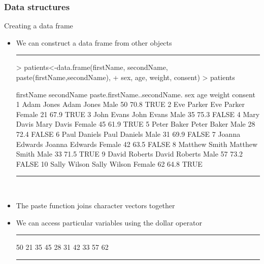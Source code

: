 \documentclass{beamer}
\begin{document}
\begin{frame}[fragile]
	\frametitle{Data structures}
	\centering \LARGE Creating a data frame
	\begin{itemize}
		\small
		\item We can construct a data frame from other objects
\rule{\textwidth}{0.4pt}
\tiny
\begin{Schunk}
\begin{Sinput}
> patients<-data.frame(firstName, secondName, paste(firstName,secondName),
+ 		     sex, age, weight, consent)
> patients
\end{Sinput}
\begin{Soutput}
   firstName secondName paste.firstName..secondName.    sex age weight consent
1       Adam      Jones                   Adam Jones   Male  50   70.8    TRUE
2        Eve     Parker                   Eve Parker Female  21   67.9    TRUE
3       John      Evans                   John Evans   Male  35   75.3   FALSE
4       Mary      Davis                   Mary Davis Female  45   61.9    TRUE
5      Peter      Baker                  Peter Baker   Male  28   72.4   FALSE
6       Paul    Daniels                 Paul Daniels   Male  31   69.9   FALSE
7     Joanna    Edwards               Joanna Edwards Female  42   63.5   FALSE
8    Matthew      Smith                Matthew Smith   Male  33   71.5    TRUE
9      David    Roberts                David Roberts   Male  57   73.2   FALSE
10     Sally     Wilson                 Sally Wilson Female  62   64.8    TRUE
\end{Soutput}
\end{Schunk}
\rule{\textwidth}{0.4pt}\\
\small
		\item The paste function joins character vectors together
		\item We can access particular variables using the dollar operator
\rule{\textwidth}{0.4pt}
\tiny
\begin{Schunk}
\begin{Soutput}
 [1] 50 21 35 45 28 31 42 33 57 62
\end{Soutput}
\end{Schunk}
\rule{\textwidth}{0.4pt}\\
\small
	\end{itemize}
\end{frame}
\end{document}
